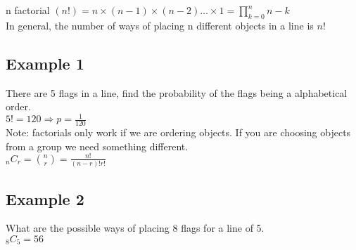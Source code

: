 \documentclass[class=article, crop=false]{standalone}
\begin{document}
n factorial $(n!) = n \times (n-1) \times (n-2) \dots \times 1 = \prod^{n}_{k=0} n - k$ \\
In general, the number of ways of placing n different objects in a line is $n!$ \\
\subsection*{Example 1}
There are 5 flags in a line, find the probability of the flags being a alphabetical order. \\
$5! = 120 \Rightarrow p = \frac{1}{120}$\\

Note: factorials only work if we are ordering objects. If you are choosing objects from a group we need something different. \\
$_nC_r = {n \choose r} = \frac{n!}{(n-r)!r!}$\\
\subsection*{Example 2}
What are the possible ways of placing 8 flags for a line of 5. \\
$_8C_5 = 56$\\
\end{document}
